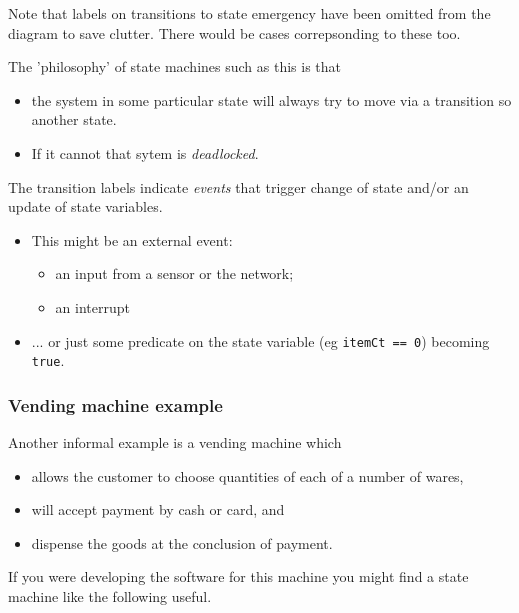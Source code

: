 \documentclass[10pt, hyperref={pdfpagelabels=false}]{beamer}
\begin{document}
\begin{frame}
Note that labels on transitions to state {\color{brown}emergency} have been omitted from the diagram to save clutter. There would be cases correpsonding to these too.

The 'philosophy' of state machines such as this is that
\begin{itemize}
\item the system in some particular state will always try to move via a transition so another state.
\item If it cannot that sytem is \emph{deadlocked}.
\end{itemize}

The transition labels indicate \emph{events} that trigger change of state and/or an update of state variables.
\begin{itemize}
\item This might be an external event:
  \begin{itemize}
  \item an input from a sensor or the network;
  \item an interrupt
  \end{itemize}
\item ... or just some predicate on the state variable (eg \texttt{\color{blue}itemCt == 0}) becoming \texttt{\color{blue}true}.
\end{itemize}
\end{frame}

\begin{frame}
\frametitle{Vending machine example}
Another informal example is a vending machine which
\begin{itemize}
\item allows the customer to choose quantities of each of a number of wares,
\item will accept payment by cash or card, and
\item dispense the goods at the conclusion of payment.
\end{itemize}

If you were developing the software for this machine you might find a state machine like the following useful.
\end{frame}
\end{document}
